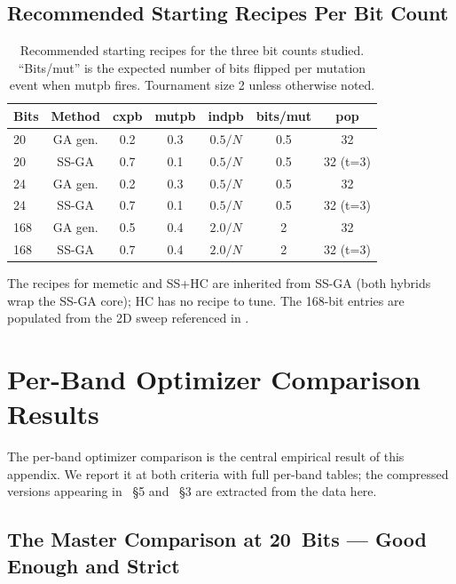\subsection{Recommended Starting Recipes Per Bit Count}

\begin{table}[h]
\centering
\caption[Recommended starting recipes by bit count]{Recommended starting recipes for the three bit counts
studied. ``Bits/mut'' is the expected number of bits flipped per
mutation event when $\mathrm{mutpb}$ fires. Tournament size 2
unless otherwise noted.}
\label{tab:recipes_summary}
\small
\begin{tabular}{lcccccc}
\hline
Bits & Method & cxpb & mutpb & indpb & bits/mut & pop \\
\hline
20  & GA gen. & 0.2 & 0.3 & $0.5/N$    & 0.5 & 32 \\
20  & SS-GA   & 0.7 & 0.1 & $0.5/N$    & 0.5 & 32 (t=3) \\
24  & GA gen. & 0.2 & 0.3 & $0.5/N$    & 0.5 & 32 \\
24  & SS-GA   & 0.7 & 0.1 & $0.5/N$    & 0.5 & 32 (t=3) \\
168 & GA gen. & 0.5 & 0.4 & $2.0/N$    & 2   & 32 \\
168 & SS-GA   & 0.7 & 0.4 & $2.0/N$    & 2   & 32 (t=3) \\
\hline
\end{tabular}
\end{table}

The recipes for memetic and SS+HC are inherited from SS-GA (both
hybrids wrap the SS-GA core); HC has no recipe to tune. The 168-bit
entries are populated from the 2D sweep referenced in
\cite{Maloney2026Paper3}.

\section{Per-Band Optimizer Comparison Results}
\label{app:results}

The per-band optimizer comparison is the central empirical result
of this appendix. We report it at both criteria with full per-band
tables; the compressed versions appearing in
\cite{Maloney2026Paper1}~\S5 and \cite{Maloney2026Paper2}~\S3 are
extracted from the data here.

\subsection{The Master Comparison at 20~Bits --- Good Enough and Strict}

